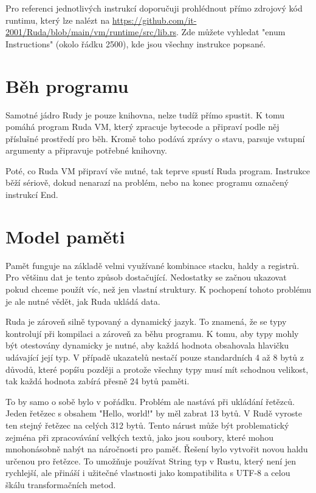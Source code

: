 \documentclass[12pt, a4paper,
twoside,        %
openright
]{report}
\begin{document}
Pro referenci jednotlivých instrukcí doporučuji prohlédnout přímo zdrojový kód runtimu, který lze nalézt na \url{https://github.com/it-2001/Ruda/blob/main/vm/runtime/src/lib.rs}. Zde můžete vyhledat "enum Instructions" (okolo řádku 2500), kde jsou všechny instrukce popsané.

\section{Běh programu}

Samotné jádro Rudy je pouze knihovna, nelze tudíž přímo spustit. K tomu pomáhá program Ruda VM, který zpracuje bytecode a připraví podle něj příslušné prostředí pro běh. Kromě toho podává zprávy o stavu, parsuje vstupní argumenty a připravuje potřebné knihovny.

Poté, co Ruda VM připraví vše nutné, tak teprve spustí Ruda program. Instrukce běží sériově, dokud nenarazí na problém, nebo na konec programu označený instrukcí End.

\clearpage
\section{Model paměti}

Pamět funguje na základě velmi využívané kombinace stacku, haldy a registrů. Pro většinu dat je tento způsob dostačující. Nedostatky se začnou ukazovat pokud chceme použít víc, než jen vlastní struktury. K pochopení tohoto problému je ale nutné vědět, jak Ruda ukládá data.

Ruda je zároveň silně typovaný a dynamický jazyk. To znamená, že se typy kontrolují při kompilaci a zároveň za běhu programu. K tomu, aby typy mohly být otestovány dynamicky je nutné, aby každá hodnota obsahovala hlavičku udávající její typ. V případě ukazatelů nestačí pouze standardních 4 až 8 bytů z důvodů, které popíšu později a protože všechny typy musí mít schodnou velikost, tak každá hodnota zabírá přesně 24 bytů paměti.

To by samo o sobě bylo v pořádku. Problém ale nastává při ukládání řetězců. Jeden řetězec s obsahem "Hello, world!" by měl zabrat 13 bytů. V Rudě vyroste ten stejný řetězec na celých 312 bytů. Tento nárust může být problematický zejména při zpracovávání velkých textů, jako jsou soubory, které mohou mnohonásobně nabýt na náročnosti pro paměť. Řešení bylo vytvořit novou haldu určenou pro řetězce. To umožňuje používat String typ v Rustu, který není jen rychlejší, ale přináší i užitečné vlastnosti jako kompatibilita s UTF-8 a celou škálu transformačních metod.
\end{document}
